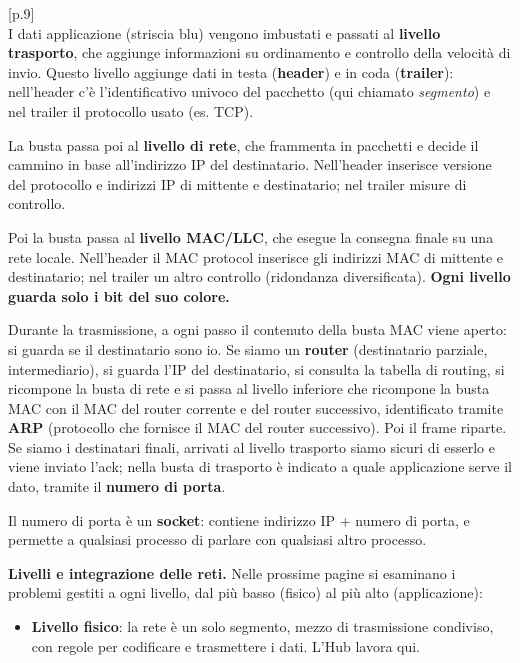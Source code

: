 \documentclass[11pt,a4paper]{report}
\begin{document}
\noindent\hfill{\footnotesize\color{gray}[p.9]}\\
I dati applicazione (striscia blu) vengono imbustati e passati al \textbf{livello trasporto}, che aggiunge informazioni su ordinamento e controllo della velocità di invio. Questo livello aggiunge dati in testa (\textbf{header}) e in coda (\textbf{trailer}): nell'header c'è l'identificativo univoco del pacchetto (qui chiamato \emph{segmento}) e nel trailer il protocollo usato (es. TCP).

La busta passa poi al \textbf{livello di rete}, che frammenta in pacchetti e decide il cammino in base all'indirizzo IP del destinatario. Nell'header inserisce versione del protocollo e indirizzi IP di mittente e destinatario; nel trailer misure di controllo.

Poi la busta passa al \textbf{livello MAC/LLC}, che esegue la consegna finale su una rete locale. Nell'header il MAC protocol inserisce gli indirizzi MAC di mittente e destinatario; nel trailer un altro controllo (ridondanza diversificata). \textbf{Ogni livello guarda solo i bit del suo colore.}

Durante la trasmissione, a ogni passo il contenuto della busta MAC viene aperto: si guarda se il destinatario sono io. Se siamo un \textbf{router} (destinatario parziale, intermediario), si guarda l'IP del destinatario, si consulta la tabella di routing, si ricompone la busta di rete e si passa al livello inferiore che ricompone la busta MAC con il MAC del router corrente e del router successivo, identificato tramite \textbf{ARP} (protocollo che fornisce il MAC del router successivo). Poi il frame riparte. Se siamo i destinatari finali, arrivati al livello trasporto siamo sicuri di esserlo e viene inviato l'ack; nella busta di trasporto è indicato a quale applicazione serve il dato, tramite il \textbf{numero di porta}.

Il numero di porta è un \textbf{socket}: contiene indirizzo IP + numero di porta, e permette a qualsiasi processo di parlare con qualsiasi altro processo.

\textbf{Livelli e integrazione delle reti.} Nelle prossime pagine si esaminano i problemi gestiti a ogni livello, dal più basso (fisico) al più alto (applicazione):
\begin{itemize}
\item \textbf{Livello fisico}: la rete è un solo segmento, mezzo di trasmissione condiviso, con regole per codificare e trasmettere i dati. L'Hub lavora qui.
\end{itemize}
\end{document}
